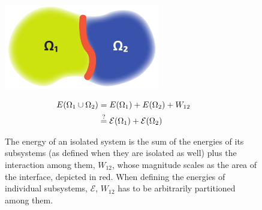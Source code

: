 \begin{figure}
\begin{minipage}{0.4\textwidth}
\centering \includegraphics{chapters/chapter3/figures/blob.pdf}
\end{minipage}
\begin{minipage}{0.5\textwidth}
\begin{align*}
  E({\mathrm\Omega}_{1}\cup{\mathrm\Omega}_2) &= E({\mathrm\Omega}_1) + E({\mathrm\Omega}_2) + W_{12} \qquad \\
  & \overset{?}{=}\mathcal{E}({\mathrm\Omega}_1)+\mathcal{E}({\mathrm\Omega}_2)
\end{align*}
\end{minipage}
\caption{
	The energy of an isolated system is the sum of the energies of its subsystems (as defined when they are isolated as well) plus the interaction among them, $W_{12}$, whose magnitude scales as the area of the interface, depicted in red. When defining the energies of individual subsystems, $\mathcal{E}$, $W_{12}$ has to be arbitrarily partitioned among them. \label{fig:energy-partition}}
\end{figure}

